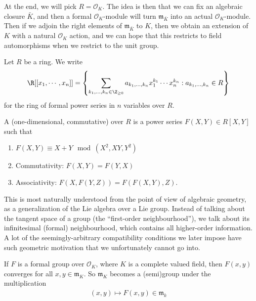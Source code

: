 \documentclass[a4paper]{article}
\begin{document}
At the end, we will pick $R = \mathcal{O}_K$. The idea is then that we can fix an algebraic closure $\bar{K}$, and then a formal $\mathcal{O}_K$-module will turn $\mathfrak{m}_{\bar{K}}$ into an actual $\mathcal{O}_K$-module. Then if we adjoin the right elements of $\mathfrak{m}_{\bar{K}}$ to $K$, then we obtain an extension of $K$ with a natural $\mathcal{O}_K$ action, and we can hope that this restricts to field automorphisms when we restrict to the unit group.


\begin{notation}
  Let $R$ be a ring. We write
  \[
    \R[[x_1, \cdots, x_n]] = \left\{ \sum_{k_1, \ldots, k_n \in \Z_{\geq 0}} a_{k_1, \ldots, k_n} x_1^{k_1} \cdots x_n^{k_n}: a_{k_1, \ldots, k_n} \in R\right\}
  \]
  for the ring of formal power series in $n$ variables over $R$.
\end{notation}

\begin{defi}
  A (one-dimensional, commutative)  over $R$ is a power series $F(X, Y) \in R[X, Y]$ such that
  \begin{enumerate}
    \item $F(X, Y) \equiv X + Y \mod (X^2, XY, Y^2)$
    \item Commutativity: $F(X, Y) = F(Y, X)$
    \item Associativity: $F(X, F(Y, Z)) = F(F(X, Y), Z)$.
  \end{enumerate}
\end{defi}
This is most naturally understood from the point of view of algebraic geometry, as a generalization of the Lie algebra over a Lie group. Instead of talking about the tangent space of a group (the ``first-order neighbourhood''), we talk about its infinitesimal (formal) neighbourhood, which contains all higher-order information. A lot of the seemingly-arbitrary compatibility conditions we later impose have such geometric motivation that we unfortunately cannot go into.

\begin{eg}
  If $F$ is a formal group over $\mathcal{O}_K$, where $K$ is a complete valued field, then $F(x, y)$ converges for all $x, y \in \mathfrak{m}_K$. So $\mathfrak{m}_K$ becomes a (semi)group under the multiplication
  \begin{align*}
    (x, y) \mapsto F(x, y) \in \mathfrak{m}_k
  \end{align*}
\end{eg}
\end{document}
